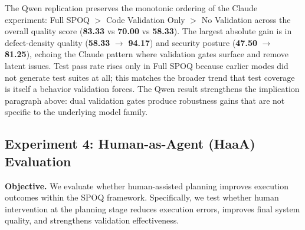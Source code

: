 \begin{table}[t]
\centering
\caption{Experiment 3 results under Qwen3.6-35B-A3B (single-run quality scores per metric, 0--100; higher is better). Mean across four benchmark tasks. Pass Rate is 0 under Modes A and B because neither mode generated a test suite at this provider; Full SPOQ generated tests on three of four tasks, yielding the 53.33 score.}
\label{tab:validation-results-qwen}
\end{table}

The Qwen replication preserves the monotonic ordering of the Claude experiment: Full SPOQ $>$ Code Validation Only $>$ No Validation across the overall quality score (\textbf{83.33} vs \textbf{70.00} vs \textbf{58.33}). The largest absolute gain is in defect-density quality (\textbf{58.33} $\rightarrow$ \textbf{94.17}) and security posture (\textbf{47.50} $\rightarrow$ \textbf{81.25}), echoing the Claude pattern where validation gates surface and remove latent issues. Test pass rate rises only in Full SPOQ because earlier modes did not generate test suites at all; this matches the broader trend that test coverage is itself a behavior validation forces. The Qwen result strengthens the implication paragraph above: dual validation gates produce robustness gains that are not specific to the underlying model family.

\subsection{Experiment 4: Human-as-Agent (HaaA) Evaluation}

\textbf{Objective.}
We evaluate whether human-assisted planning improves execution outcomes within the SPOQ framework. Specifically, we test whether human intervention at the planning stage reduces execution errors, improves final system quality, and strengthens validation effectiveness.

